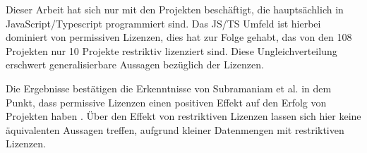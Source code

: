 \bigskip
\noindent
Dieser Arbeit hat sich nur mit den Projekten beschäftigt, die hauptsächlich in JavaScript/Typescript
programmiert sind. Das JS/TS Umfeld ist hierbei dominiert von permissiven Lizenzen, dies hat zur
Folge gehabt, das von den 108 Projekten nur 10 Projekte restriktiv lizenziert sind. Diese
Ungleichverteilung erschwert generalisierbare Aussagen bezüglich der Lizenzen.


\bigskip
\noindent
Die Ergebnisse bestätigen die Erkenntnisse von Subramaniam et al. in dem Punkt, dass permissive Lizenzen
einen positiven Effekt auf den Erfolg von Projekten haben \cite{subramaniamDeterminantsOpenSource2009}.
Über den Effekt von restriktiven Lizenzen lassen sich hier keine äquivalenten Aussagen treffen, aufgrund
kleiner Datenmengen mit restriktiven Lizenzen.










